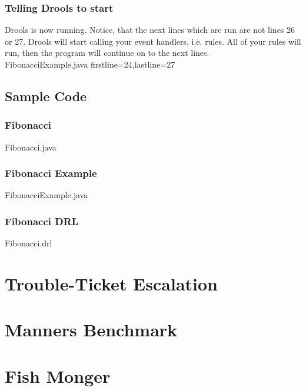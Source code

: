 \subsection {Telling Drools to start}
Drools is now running. 
Notice, that the next lines which are run are not lines 26 or 27. 
Drools will start calling your event handlers, i.e. rules.
All of your rules will run, then the program will continue on to the next lines.
\\  {FibonacciExample.java} {firstline=24,lastline=27}



\clearpage
\section {Sample Code}
\subsection {Fibonacci}
 {Fibonacci.java}

\clearpage
\subsection {Fibonacci Example}
 {FibonacciExample.java}

\clearpage
\subsection {Fibonacci DRL}
 {Fibonacci.drl}





\cleardoublepage
\chapter{Trouble-Ticket Escalation}

\cleardoublepage
\chapter{Manners Benchmark}



\cleardoublepage
\chapter{Fish Monger}
